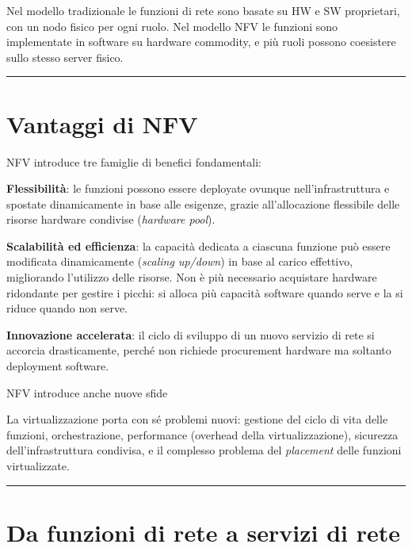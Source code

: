\documentclass[
  italian,
  openany]{book}
\begin{document}
Nel modello tradizionale le funzioni di rete sono basate su HW e SW
proprietari, con un nodo fisico per ogni ruolo. Nel modello NFV le
funzioni sono implementate in software su hardware commodity, e più
ruoli possono coesistere sullo stesso server fisico.

\begin{center}\rule{0.5\linewidth}{0.5pt}\end{center}

\section{Vantaggi di NFV}\label{vantaggi-di-nfv}

NFV introduce tre famiglie di benefici fondamentali:

\textbf{Flessibilità}: le funzioni possono essere deployate ovunque
nell'infrastruttura e spostate dinamicamente in base alle esigenze,
grazie all'allocazione flessibile delle risorse hardware condivise
(\emph{hardware pool}).

\textbf{Scalabilità ed efficienza}: la capacità dedicata a ciascuna
funzione può essere modificata dinamicamente (\emph{scaling up/down}) in
base al carico effettivo, migliorando l'utilizzo delle risorse. Non è
più necessario acquistare hardware ridondante per gestire i picchi: si
alloca più capacità software quando serve e la si riduce quando non
serve.

\textbf{Innovazione accelerata}: il ciclo di sviluppo di un nuovo
servizio di rete si accorcia drasticamente, perché non richiede
procurement hardware ma soltanto deployment software.

\begin{calloutnote}{NFV introduce anche nuove sfide}

La virtualizzazione porta con sé problemi nuovi: gestione del ciclo di
vita delle funzioni, orchestrazione, performance (overhead della
virtualizzazione), sicurezza dell'infrastruttura condivisa, e il
complesso problema del \emph{placement} delle funzioni virtualizzate.

\end{calloutnote}

\begin{center}\rule{0.5\linewidth}{0.5pt}\end{center}

\section{Da funzioni di rete a servizi di
rete}\label{da-funzioni-di-rete-a-servizi-di-rete}
\end{document}

